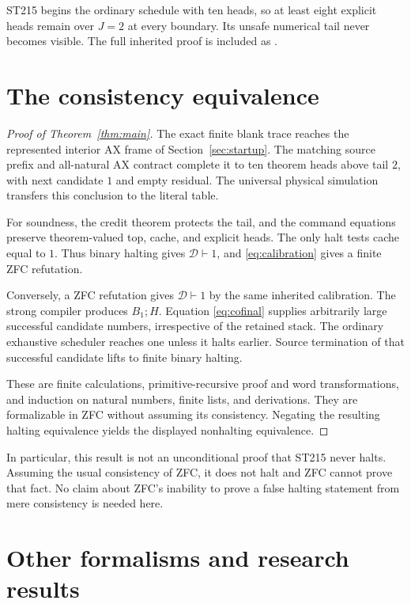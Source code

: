 \documentclass[11pt]{article}
\newcommand{\calD}{\mathcal D}
\newcommand{\file}[1]{{\small\path{#1}}}
\begin{document}
ST215 begins the ordinary schedule with ten heads,
so at least eight explicit heads remain over $J=2$
at every boundary. Its unsafe numerical tail never
becomes visible. The full inherited proof is
included as \file{proofs/protected_credit.md}.

\section{The consistency equivalence}
\label{sec:equivalence}

\begin{proof}[Proof of Theorem~\ref{thm:main}]
The exact finite blank trace reaches the represented
interior AX frame of Section~\ref{sec:startup}.
The matching source prefix and all-natural AX
contract complete it to ten theorem heads above
tail $2$, with next candidate $1$ and empty
residual. The universal physical simulation
transfers this conclusion to the literal table.

For soundness, the credit theorem protects the
tail, and the command equations preserve
theorem-valued top, cache, and explicit heads.
The only halt tests cache equal to $1$.
Thus binary halting gives $\calD\vdash1$, and
\eqref{eq:calibration} gives a finite ZFC refutation.

Conversely, a ZFC refutation gives $\calD\vdash1$
by the same inherited calibration. The strong
compiler produces $B_1;H$. Equation
\eqref{eq:cofinal} supplies arbitrarily large
successful candidate numbers, irrespective of
the retained stack. The ordinary exhaustive
scheduler reaches one unless it halts earlier.
Source termination of that successful candidate
lifts to finite binary halting.

These are finite calculations, primitive-recursive
proof and word transformations, and induction on
natural numbers, finite lists, and derivations.
They are formalizable in ZFC without assuming
its consistency. Negating the resulting halting
equivalence yields the displayed nonhalting
equivalence.
\end{proof}

In particular, this result is not an unconditional
proof that ST215 never halts. Assuming the usual
consistency of ZFC, it does not halt and ZFC
cannot prove that fact. No claim about ZFC's
inability to prove a false halting statement
from mere consistency is needed here.

\section{Other formalisms and research results}
\label{sec:research}
\end{document}
